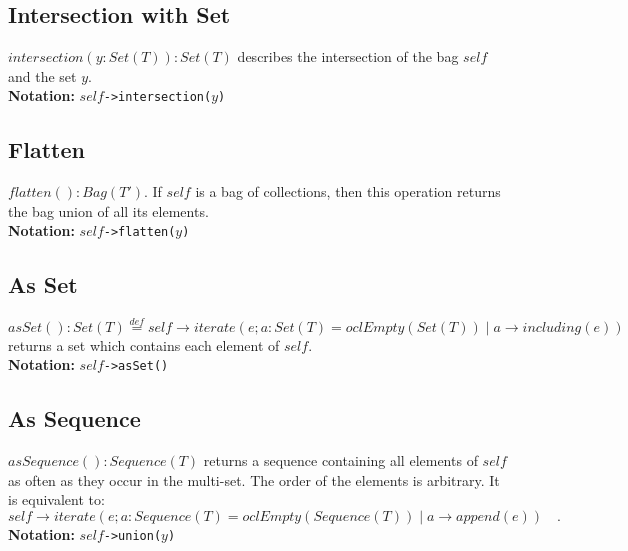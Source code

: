 \subsection{Intersection with Set}
$\mathit{intersection}(y:\mathit{Set}(T)):\mathit{Set}(T)$ describes the
intersection
  of the bag $\mathit{self}$ and the set $y$.\\
  {\bf Notation:} $\mathit{self}$\verb+->intersection(+$y$\verb+)+
\subsection{Flatten}
$\mathit{flatten}():\mathit{Bag}(T')$.  If $\mathit{self}$ is a bag of
collections,
  then this operation returns the bag union of all its elements.\\
  {\bf Notation:} $\mathit{self}$\verb+->flatten(+$y$\verb+)+
\subsection{As Set}
$\mathit{asSet}():
  \mathit{Set}(T)\stackrel{def}{=}\mathit{self}\rightarrow\mathit{iterate}(e;a:\mathit{Set}(T)=\mathit{oclEmpty}(\mathit{Set}(T))\mid
  a\rightarrow\mathit{including}(e))$ returns a set which contains each
  element of $\mathit{self}$.\\
  {\bf Notation:} $\mathit{self}$\verb+->asSet()+
\subsection{As Sequence}
$\mathit{asSequence}():\mathit{Sequence}(T)$ returns a sequence containing
  all elements of $\mathit{self}$ as often as they occur in the multi-set.
  The order of the elements is arbitrary. It is equivalent to:
  \begin{equation*}
    \mathit{self}\rightarrow\mathit{iterate}(e;a:\mathit{Sequence}(T)=\mathit{oclEmpty}(\mathit{Sequence}(T))\mid
    a\rightarrow\mathit{append}(e))\quad.
  \end{equation*}
  {\bf Notation:} $\mathit{self}$\verb+->union(+$y$\verb+)+
